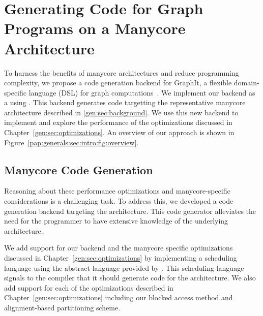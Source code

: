 \chapter{Generating Code for Graph Programs on a Manycore Architecture}\label{gen:sec:graphitbackend}
%

\introOverviewFigure

To harness the benefits of manycore architectures and reduce programming complexity, we propose a code generation backend for GraphIt, a flexible domain-specific language (DSL) for graph computations~\cite{zhang2018graphit}. 
We implement our backend as a \graphvm using \ugc.
This backend generates code targetting the representative manycore architecture described in \ref{gen:sec:background}.
We use this new backend to implement and explore the performance of the optimizations discussed in Chapter~\ref{gen:sec:optimizations}.
An overview of our approach is shown in Figure~\ref{pap:generals:sec:intro:fig:overview}.

\section{Manycore Code Generation}\label{sec:method:sub:baseline}

Reasoning about these performance optimizations and manycore-specific considerations is a challenging task.
To address this, we developed a code generation backend targeting the \hbmc architecture.
This code generator alleviates the need for the programmer to have extensive knowledge of the underlying architecture.

We add support for our backend and the manycore specific optimizations discussed in Chapter~\ref{gen:sec:optimizations} by implementing a \hb scheduling language using the abstract language provided by \GG.
This scheduling language signals to the \graphit compiler that it should generate code for the \hbmc architecture.
We also add support for each of the optimizations described in Chapter~\ref{gen:sec:optimizations} including our blocked access method and alignment-based partitioning scheme.

